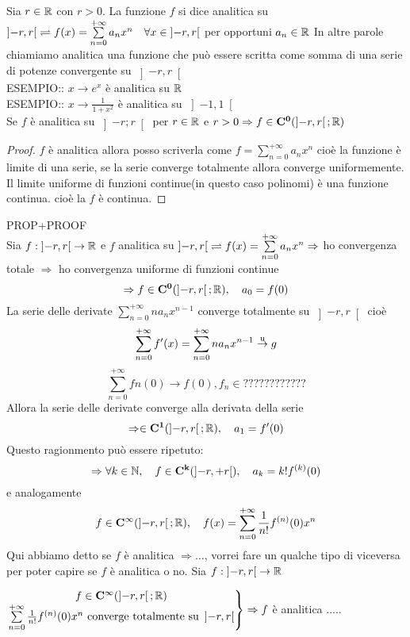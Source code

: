 Sia $r\in \mathbb{R}$ con $r>0$. La funzione $f$ si dice analitica su $\left]-r,r\right[ \rightleftharpoons f(x)=\sum\limits_{n=0}^{+\infty}a_nx^n \quad \forall x\in\left]-r,r\right[$ per opportuni $a_n\in \mathbb{R}$
\observation
In altre parole chiamiamo analitica una funzione che può essere scritta come somma di una serie di potenze convergente su $\left]-r,r\right[$ \\
ESEMPIO:: $x\to e^x$ è analitica su $ \mathbb{R}$\\
ESEMPIO:: $x\to\frac{1}{1+x^2}$ è analitica su $\left]-1,1\right[$\\
\proposition
Se $f$ è analitica su $\left]-r;r\right[$ per $r\in \mathbb{R}$ e $r>0\Rightarrow f\in \mathbf{C^{0}}(\left]-r,r\right[; \mathbb{R})$
\begin{proof}
	$f$ è analitica  allora posso scriverla come $f=\sum\limits_{n=0}^{+\infty}a_nx^n$ cioè la funzione è limite di una serie, se la serie converge totalmente allora converge uniformemente. Il limite uniforme di funzioni continue(in questo caso polinomi) è una funzione continua. cioè la $f$ è continua.
\end{proof}
\proposition PROP+PROOF\\
Sia $f:\left]-r,r\right[\to \mathbb{R}$ e $f$ analitica su $\left]-r,r\right[ \rightleftharpoons f(x)=\sum\limits_{n=0}^{+\infty}a_nx^n \Rightarrow$ ho convergenza totale $\Rightarrow$ ho convergenza uniforme di funzioni continue
\[\Rightarrow f\in \mathbf{C^{0}}(\left]-r,r\right[; \mathbb{R}),\quad a_0=f(0)\]
La serie delle derivate $\sum\limits_{n=0}^{+\infty}na_nx^{n-1}$ converge totalmente su $\left]-r,r\right[$ cioè
\[\sum\limits_{n=0}^{+\infty}f'(x)=\sum\limits_{n=0}^{+\infty}na_nx^{n-1} \overset{\text{u}}{\to} g\]
\[\sum\limits_{n=0}^{+\infty}fn(0)\to f(0), f_n\in ????????????\]
Allora la serie delle derivate converge alla derivata della serie
\[\Rightarrow \in \mathbf{C^{1}}(\left]-r,r\right[; \mathbb{R}),\quad a_1=f'(0)\]
Questo ragionmento può essere ripetuto:
\[\Rightarrow \forall k\in\mathbb{N},\quad f\in \mathbf{C^{k}}(\left]-r,+r\right[),\quad a_k=k!f^{(k)}(0)\]
e analogamente
\[f\in \mathbf{C^{\infty}}(\left]-r,r\right[; \mathbb{R}),\quad f(x)=\sum\limits_{n=0}^{+\infty}\frac{1}{n!}f^{(n)}(0)x^n\]
\observation Qui abbiamo detto se $f$ è analitica $\Rightarrow \ldots$, vorrei fare un qualche tipo di viceversa per poter capire se $f$ è analitica o no.
\proposition
Sia $f:\left]-r,r\right[\to \mathbb{R}$
\begin{center}
	$\left.\begin{matrix}
	f\in \mathbf{C^{\infty}}(\left]-r,r\right[; \mathbb{R})\\
	\sum\limits_{n=0}^{+\infty}\frac{1}{n!}f^{(n)}(0)x^n\text{ converge totalmente su } \left]-r,r\right[\\
	\end{matrix}\right\}\Rightarrow f$ è analitica  .....
\end{center}
